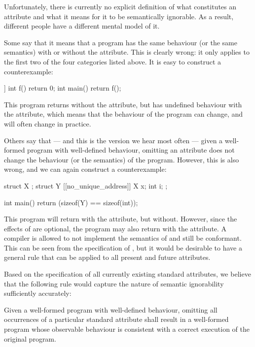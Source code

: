 Unfortunately, there is currently no explicit definition of what constitutes an attribute and what it means for it to be semantically ignorable. As a result, different people have a different mental model of it.

Some say that it means that a program has the same behaviour (or the same semantics) with or without the attribute. This is clearly wrong: it only applies to the first two of the four categories listed above. It is easy to construct a counterexample:

\begin{codeblock}
[[noreturn]] int f() { return 0; }
int main() { return f(); }
\end{codeblock}

This program returns  without the attribute, but has undefined behaviour with the attribute, which means that the behaviour of the program can change, and will often change in practice.

Others say that --- and this is the version we hear most often --- given a well-formed program with well-defined behaviour, omitting an attribute does not change the behaviour (or the semantics) of the program. However, this is also wrong, and we can again construct a counterexample:

\begin{codeblock}
struct X {};
struct Y {
  [[no_unique_address]] X x;
  int i; 
};

int main() { return (sizeof(Y) == sizeof(int)); }
\end{codeblock}

This program will return  with the attribute, but  without. However, since the effects of \mbox{} are optional, the program may also return  with the attribute. A compiler is allowed to not implement the semantics of  and still be conformant. This can be seen from the specification of , but it would be desirable to have a general rule that can be applied to all present and future attributes.

Based on the specification of all currently existing standard attributes, we believe that the following rule would capture the nature of semantic ignorability sufficiently accurately:

\begin{adjustwidth}{0.5cm}{0.5cm}
Given a well-formed program with well-defined behaviour, omitting all occurrences of a particular standard attribute shall result in a well-formed program whose observable behaviour is consistent with a correct execution of the original program.
\end{adjustwidth}

